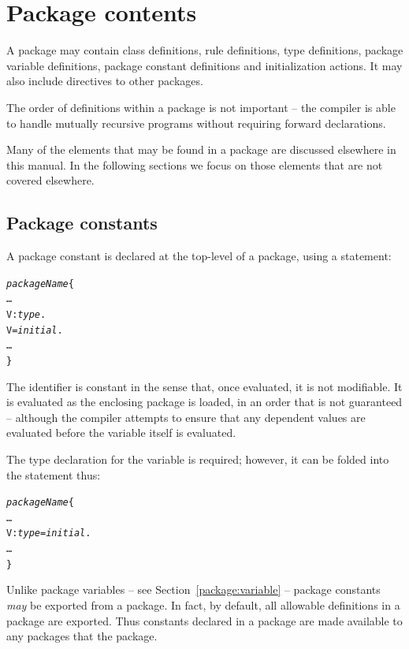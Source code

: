 \section{Package contents}
\label{package:contents}

A package may contain class definitions, rule definitions, type definitions, package variable definitions, package constant definitions and initialization actions. It may also include directives to  other packages.

The order of definitions within a package is not important -- the \go compiler is able to handle mutually recursive programs without requiring forward declarations.

Many of the elements that may be found in a package are discussed elsewhere in this manual. In the following sections we focus on those elements that are not covered elsewhere.

\subsection{Package constants}
\label{package:constant}

A package constant is declared at the top-level of a package, using a \q{=} statement:
\begin{alltt}
\emph{packageName}\{
  \ldots
  V:\emph{type}.
  V = \emph{initial}.
  \ldots
\}
\end{alltt}
The identifier  is constant in the sense that, once evaluated, it is not modifiable. It is evaluated as the enclosing package is loaded, in an order that is not guaranteed -- although the compiler attempts to ensure that any dependent values are evaluated before the variable itself is evaluated.

The type declaration for the variable is required; however, it can be folded into the statement thus:
\begin{alltt}
\emph{packageName}\{
  \ldots
  V:\emph{type} = \emph{initial}.
  \ldots
\}
\end{alltt}
Unlike package variables -- see Section~\vref{package:variable} -- package constants \emph{may} be exported from a package. In fact, by default, all allowable definitions in a package are exported. Thus constants declared in a package are made available to any packages that  the package.


